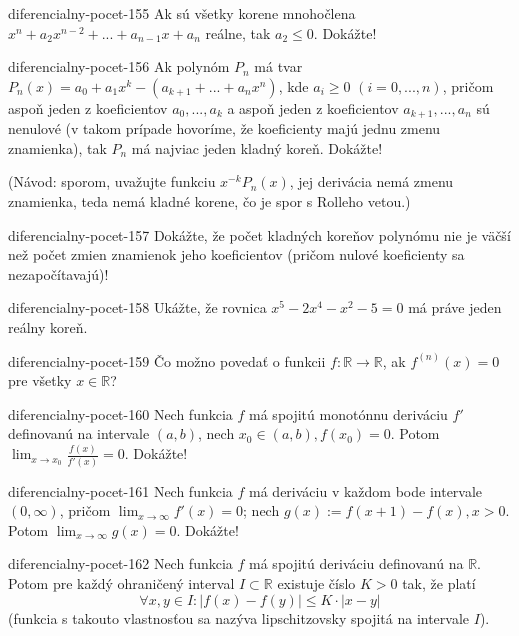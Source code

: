 \begin{defproblem}{diferencialny-pocet-155}
Ak sú všetky korene mnohočlena $x^n+a_2x^{n-2}+...+a_{n-1}x+a_n$ reálne, tak $a_2\leq 0$. Dokážte!
\end{defproblem}

\begin{defproblem}{diferencialny-pocet-156}
Ak polynóm $P_n$ má tvar $P_n(x)=a_0+a_1x^k-(a_{k+1}+...+a_nx^{n})$, kde $a_i \geq 0$ $(i=0,...,n)$, pričom aspoň jeden z koeficientov $a_0,...,a_k$ a aspoň jeden z koeficientov $a_{k+1},...,a_n$ sú nenulové (v takom prípade hovoríme, že koeficienty majú jednu zmenu znamienka), tak $P_n$ má najviac jeden kladný koreň. Dokážte!

(Návod: sporom, uvažujte funkciu $x^{-k}P_n(x)$, jej derivácia nemá zmenu znamienka, teda nemá kladné korene, čo je spor s Rolleho vetou.)
\end{defproblem}

\begin{defproblem}{diferencialny-pocet-157}
Dokážte, že počet kladných koreňov polynómu nie je väčší než počet zmien znamienok jeho koeficientov (pričom nulové koeficienty sa nezapočítavajú)!
\end{defproblem}

\begin{defproblem}{diferencialny-pocet-158}
Ukážte, že rovnica $x^5-2x^4-x^2-5=0$ má práve jeden reálny koreň.
\end{defproblem}

\begin{defproblem}{diferencialny-pocet-159}
Čo možno povedať o funkcii $f:\mathbb{R}\rightarrow\mathbb{R}$, ak $f^{(n)}(x)=0$ pre všetky $x\in\mathbb{R}$?
\end{defproblem}

\begin{defproblem}{diferencialny-pocet-160}
Nech funkcia $f$ má spojitú monotónnu deriváciu $f'$ definovanú na intervale $(a,b)$, nech $x_0\in (a,b),f(x_0)=0$. Potom $\lim_{x\rightarrow x_0}\frac{f(x)}{f'(x)}=0$. Dokážte!
\end{defproblem}

\begin{defproblem}{diferencialny-pocet-161}
Nech funkcia $f$ má deriváciu v každom bode intervale $(0,\infty)$, pričom $\lim_{x\rightarrow \infty}f'(x)=0$; nech $g(x):=f(x+1)-f(x),x>0$. Potom $\lim_{x\rightarrow \infty}g(x)=0$. Dokážte!
\end{defproblem}

\begin{defproblem}{diferencialny-pocet-162}
Nech funkcia $f$ má spojitú deriváciu definovanú na $\mathbb{R}$. Potom pre každý ohraničený interval $I \subset \mathbb{R}$ existuje číslo $K>0$ tak, že platí 
$$\forall x,y\in I: |f(x)-f(y)|\leq K\cdot |x-y|$$
(funkcia s takouto vlastnosťou sa nazýva lipschitzovsky spojitá na intervale $I$).
\end{defproblem}


